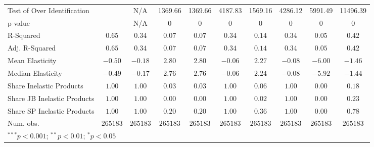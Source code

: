 \begin{tabular}{l c c c c c c c c c}
Test of Over Identification &               & N/A           & 1369.66       & 1369.66       & 4187.83       & 1569.16       & 4286.12       & 5991.49       & 11496.39      \\
p-value                     &               & N/A           & 0             & 0             & 0             & 0             & 0             & 0             & 0             \\
R-Squared                   & $0.65$        & $0.34$        & $0.07$        & $0.07$        & $0.34$        & $0.14$        & $0.34$        & $0.05$        & $0.42$        \\
Adj. R-Squared              & $0.65$        & $0.34$        & $0.07$        & $0.07$        & $0.34$        & $0.14$        & $0.34$        & $0.05$        & $0.42$        \\
Mean Elasticity             & $-0.50$       & $-0.18$       & $2.80$        & $2.80$        & $-0.06$       & $2.27$        & $-0.08$       & $-6.00$       & $-1.46$       \\
Median Elasticity           & $-0.49$       & $-0.17$       & $2.76$        & $2.76$        & $-0.06$       & $2.24$        & $-0.08$       & $-5.92$       & $-1.44$       \\
Share Inelastic Products    & $1.00$        & $1.00$        & $0.03$        & $0.03$        & $1.00$        & $0.06$        & $1.00$        & $0.00$        & $0.18$        \\
Share JB Inelastic Products & $1.00$        & $1.00$        & $0.00$        & $0.00$        & $1.00$        & $0.02$        & $1.00$        & $0.00$        & $0.23$        \\
Share SP Inelastic Products & $1.00$        & $1.00$        & $0.20$        & $0.20$        & $1.00$        & $0.36$        & $1.00$        & $0.00$        & $0.78$        \\
Num. obs.                   & $265183$      & $265183$      & $265183$      & $265183$      & $265183$      & $265183$      & $265183$      & $265183$      & $265183$      \\
\bottomrule
\multicolumn{10}{l}{\scriptsize{$^{***}p<0.001$; $^{**}p<0.01$; $^{*}p<0.05$}}
\end{tabular}
